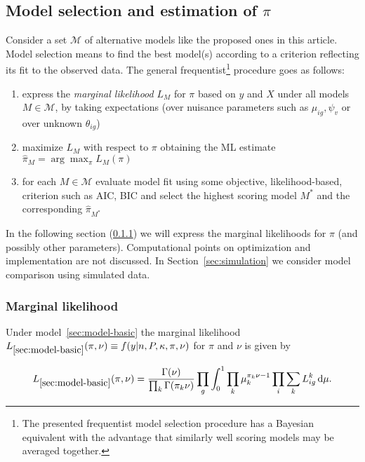 \documentclass[letterpaper]{article}
\begin{document}
\subsection{Model selection and estimation of \(\pi\)}
\label{sec:model-selection}

Consider a set \(\mathcal{M}\) of alternative models like the proposed ones in
this article.  Model selection means to find the best model(s) according to a
criterion reflecting its fit to the observed data.
The general frequentist\footnote{The presented frequentist model selection
procedure has a Bayesian
equivalent with the advantage that similarly well scoring models may be
averaged together. } procedure goes as follows:
\begin{enumerate}
\item
express the \emph{marginal likelihood} \(L_M\) for \(\pi\) based on \(y\)
and \(X\) under all models \(M\in \mathcal{M}\), by taking expectations (over nuisance
parameters such as \(\mu_{ig},\psi_v\) or over unknown \(\theta_{ig}\))
\item 
maximize \(L_M\) with respect to \(\pi\) obtaining the ML estimate
\(\hat{\pi}_M=\arg\max_\pi L_{M}(\pi)\)
\item for each \(M\in\mathcal{M}\) evaluate model fit using some objective,
likelihood-based, criterion such as AIC, BIC and select the highest scoring model
\(M^*\) and the corresponding \(\hat{\pi}_{M^*}\)
\end{enumerate}


In the following section (\ref{sec:marginal-likelihood-pi}) we will express
the marginal likelihoods for \(\pi\) (and possibly other parameters).
Computational points on optimization and implementation are not discussed.  In
Section~\ref{sec:simulation} we consider model comparison using simulated
data.

\subsubsection{Marginal likelihood}
\label{sec:marginal-likelihood-pi}

Under model~\ref{sec:model-basic} the marginal likelihood
\(L_{\ref{sec:model-basic}}(\pi,\nu)\equiv
f(y|n,P,\kappa,\pi,\nu)\) for \(\pi\) and \(\nu\) is given by

\begin{equation}
\label{eq:L-model-basic}
L_{\ref{sec:model-basic}}(\pi,\nu) =
\frac{\Gamma(\nu)}{\prod_k \Gamma(\pi_k\nu)}
\prod_{g} \int_{0}^{1} \prod_k \mu_k^{\pi_k\nu-1}
\prod_{i}
\sum_k L_{ig}^k
\, \mathrm{d}\mu.
\end{equation}
\end{document}
